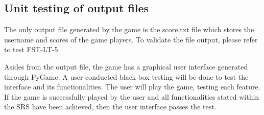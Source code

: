 \documentclass[12pt, titlepage]{article}
\begin{document}
\subsection{Unit testing of output files}		

The only output file generated by the game is the score.txt file which stores the username and scores of the game players. To validate the file output, please refer to test FST-LT-5. 

Asides from the output file, the game has a graphical user interface generated through PyGame. A user conducted black box testing will be done to test the interface and its functionalities. The user will play the game, testing each feature. If the game is successfully played by the user and all functionalities stated within the SRS have been achieved, then the user interface passes the test.






\newpage
\end{document}
